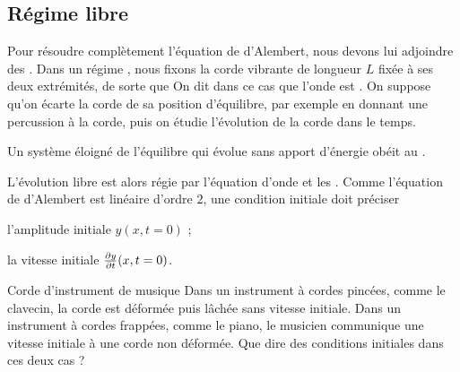 \documentclass[12pt,fancy]{cours}
\begin{document}
\subsection{Régime libre}
Pour résoudre complètement l’équation de d’Alembert, nous devons lui adjoindre des . Dans un régime , nous fixons la corde vibrante  de longueur $L$ fixée à ses deux extrémités, de sorte que
On dit dans ce cas que l'onde est .
On suppose qu'on écarte la corde de sa position d'équilibre, par exemple en donnant
 une percussion à la corde, puis on étudie l’évolution de la corde dans le temps.

 \begin{definition}\label{def:}
  Un système éloigné de l’équilibre qui évolue sans apport d’énergie obéit au .
 \end{definition}
 L'évolution libre est alors régie par l'équation d'onde et les . Comme l'équation de d'Alembert est linéaire d'ordre $2$, une condition initiale doit préciser 
 \begin{liste}
  \item
  l'amplitude initiale $y(x,t=0)$ ;
  \item la vitesse initiale $\frac{\partial{y}}{\partial{t}}(x,t=0)$.
 \end{liste}

\begin{exemple}{Corde d'instrument de musique}
Dans un instrument à cordes pincées, comme le clavecin, la corde est déformée puis lâchée sans vitesse initiale. Dans un instrument à cordes frappées, comme le piano, le musicien communique une vitesse initiale à une corde non déformée. Que dire des conditions initiales dans ces deux cas ?

\end{exemple}
%
\end{document}
